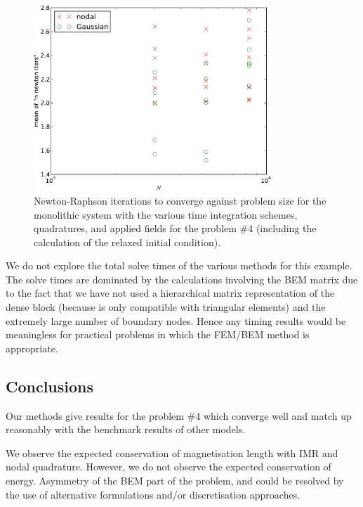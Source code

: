 \begin{figure}
  \centering
  \includegraphics[width=0.8\textwidth]
  {plots/mumag4_monolithic_its/meanofnnewtonitersvsinitialnnode.pdf}
  \caption{Newton-Raphson iterations to converge against problem size
    for the monolithic system with the various time integration schemes, quadratures, and applied fields for the \mumag problem \#4 (including the calculation of the relaxed initial condition).}
  \label{fig:mumag4-newton-iters}
\end{figure}


We do not explore the total solve times of the various methods for this example.
The solve times are dominated by the calculations involving the BEM matrix due to the fact that we have not used a hierarchical matrix representation of the dense block (because \hlib is only compatible with triangular elements) and the extremely large number of boundary nodes.
Hence any timing results would be meaningless for practical problems in which the FEM/BEM method is appropriate.


\subsection{Conclusions}

Our methods give results for the \mumag problem \#4 which converge well and match up reasonably with the benchmark results of other models.

We observe the expected conservation of magnetisation length with IMR and nodal quadrature.
However, we do not observe the expected conservation of energy.
Asymmetry of the BEM part of the problem, and could be resolved by the use of alternative formulations and/or discretisation approaches.

